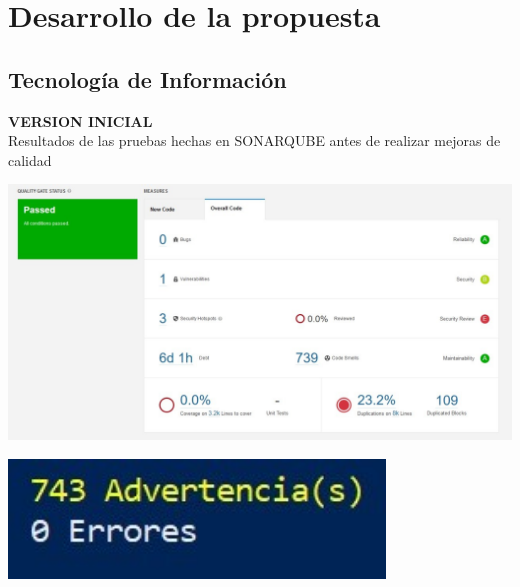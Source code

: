 \documentclass[12pt,letterpaper]{article}
\begin{document}
\section{Desarrollo de la propuesta}

\subsection{Tecnología de Información}

\textbf{VERSION INICIAL}
\\
Resultados de las pruebas hechas en SONARQUBE antes de realizar mejoras de calidad
\\
\begin{center}
	\includegraphics[width=15cm]{./img/image2.jpg} 
\end{center}
\begin{center}
	\includegraphics[width=10cm]{./img/image3.jpg} 
\end{center}
\end{document}
